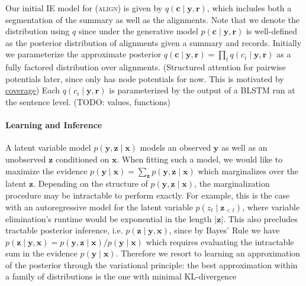 \documentclass[11pt]{article}
\newcommand{\bc}{\mathbf{c}}
\newcommand{\br}{\mathbf{r}}
\newcommand{\bx}{\mathbf{x}}
\newcommand{\by}{\mathbf{y}}
\newcommand{\bz}{\mathbf{z}}
\begin{document}
Our initial IE model for (\textsc{align}) is given by $q(\bc\mid\by,\br)$,
which includes both a segmentation of the summary as well as the alignments.
Note that we denote the distribution using $q$ since under the generative model
$p(\bc\mid\by,\br)$ is well-defined as the posterior distribution of alignments
given a summary and records.
Initially we parameterize the approximate posterior
$q(\bc\mid\by,\br)=\prod_tq(c_i\mid\by,\br)$
as a fully factored distribution over alignments.
(Structured attention for pairwise potentials later,
since only has node potentials for now.
This is motivated by \underline{coverage})
Each $q(c_i\mid\by,\br)$ is parameterized by the output
of a BLSTM run at the sentence level.
(TODO: values, functions)

\paragraph{Learning and Inference}
\begin{comment}
\item Question: Do I need to motivate approximate inference?
I could also argue that rather than computing the posterior exactly,
at test time using the approximation directly can be more efficient,
especially if it is fully factored
\item Need to figure out if this is the right place for this
\item Describe how to incorporate the weak supervision through posterior constraints
\end{comment}
A latent variable model $p(\by,\bz\mid\bx)$ models an
observed $\by$ as well as an unobserved $\bz$ conditioned on $\bx$.
When fitting such a model, we would like to maximize the evidence
$p(\by\mid\bx)=\sum_\bz p(\by,\bz\mid\bx)$ which marginalizes over
the latent $\bz$.
Depending on the structure of $p(\by,\bz\mid\bx)$,
the marginalization procedure may be intractable to perform exactly.
For example, this is the case with an autoregressive model for the latent
variable $p(z_t\mid \bz_{<t})$, where variable elimination's runtime would be
exponential in the length $|\bz|$.
This also precludes tractable posterior inference, i.e. $p(\bz\mid\by,\bx)$,
since by Bayes' Rule we have $p(\bz\mid\by,\bx)=p(\by,\bz\mid\bx)/p(\by\mid\bx)$
which requires evaluating the intractable sum in the evidence $p(\by\mid\bx)$.
Therefore we resort to learning an approximation of the posterior through the variational principle:
the best approximation within a family of distributions is the one with minimal KL-divergence
\end{document}

